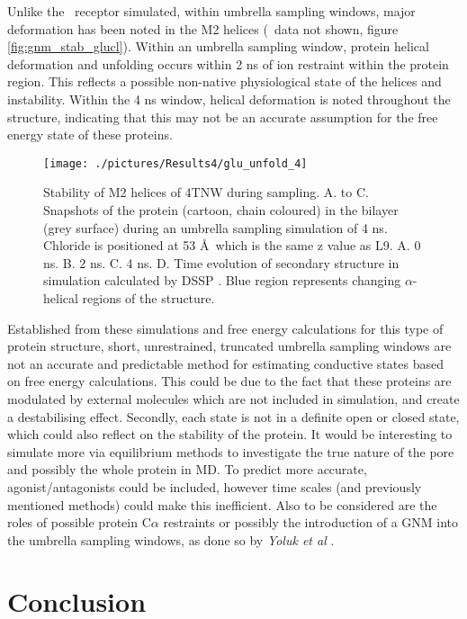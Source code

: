 Unlike the \HT\ receptor simulated, within umbrella sampling windows, major deformation has been noted in the M2 helices (\HT\ data not shown, figure \ref{fig:gnm_stab_glucl}). Within an umbrella sampling window, protein helical deformation and unfolding occurs within 2 ns of ion restraint within the protein region. This reflects a possible non-native physiological state of the helices and instability. Within the 4 ns window, helical deformation is noted throughout the structure, indicating that this may not be an accurate assumption for the free energy state of these proteins. 

\begin{figure}[H]
\begin{center}
\texttt{[image: ./pictures/Results4/glu\_unfold\_4]}
\caption[Stability of M2 helices of 4TNW during sampling.]{Stability of M2 helices of 4TNW during sampling. A. to C. Snapshots of the protein (cartoon, chain coloured) in the bilayer (grey surface) during an umbrella sampling simulation of 4 ns. Chloride is positioned at 53 \AA\ which is the same z value as L9\textquotesingle. A. 0 ns. B. 2 ns. C. 4 ns. D. Time evolution of secondary structure in simulation calculated by DSSP \cite{Carter2003}. Blue region represents changing $\alpha$-helical regions of the structure.}
\label{fig:glu_unfold_4}
\end{center}
\end{figure}

Established from these simulations and free energy calculations for this type of protein structure, short, unrestrained, truncated umbrella sampling windows are not an accurate and predictable method for estimating conductive states based on free energy calculations. This could be due to the fact that these proteins are modulated by external molecules which are not included in simulation, and create a destabilising effect. Secondly, each state is not in a definite open or closed state, which could also reflect on the stability of the protein. It would be interesting to simulate more via equilibrium methods to investigate the true nature of the pore and possibly the whole protein in MD. To predict more accurate, agonist/antagonists could be included, however time scales (and previously mentioned methods) could make this inefficient. Also to be considered are the roles of possible protein C$\alpha$ restraints or possibly the introduction of a GNM into the umbrella sampling windows, as done so by \textit{Yoluk et al} \cite{Yoluk2015}. 

\section{Conclusion}

